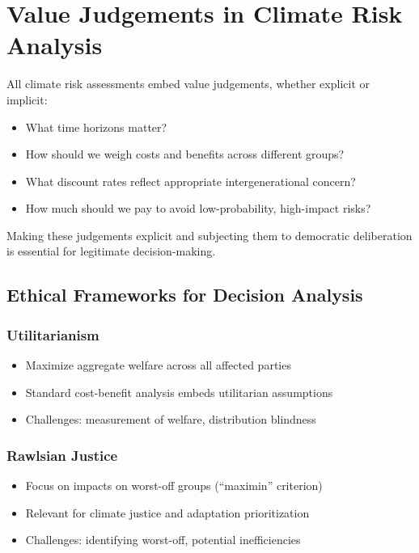 \documentclass[
  letterpaper,
  DIV=11,
  numbers=noendperiod]{scrreprt}
\providecommand{\tightlist}{%
  \setlength{\itemsep}{0pt}\setlength{\parskip}{0pt}}
\begin{document}
\section{Value Judgements in Climate Risk
Analysis}\label{value-judgements-in-climate-risk-analysis}

All climate risk assessments embed value judgements, whether explicit or
implicit:

\begin{itemize}
\tightlist
\item
  What time horizons matter?
\item
  How should we weigh costs and benefits across different groups?
\item
  What discount rates reflect appropriate intergenerational concern?
\item
  How much should we pay to avoid low-probability, high-impact risks?
\end{itemize}

Making these judgements explicit and subjecting them to democratic
deliberation is essential for legitimate decision-making.

\subsection{Ethical Frameworks for Decision
Analysis}\label{ethical-frameworks-for-decision-analysis}

\subsubsection{Utilitarianism}\label{utilitarianism}

\begin{itemize}
\tightlist
\item
  Maximize aggregate welfare across all affected parties
\item
  Standard cost-benefit analysis embeds utilitarian assumptions
\item
  Challenges: measurement of welfare, distribution blindness
\end{itemize}

\subsubsection{Rawlsian Justice}\label{rawlsian-justice}

\begin{itemize}
\tightlist
\item
  Focus on impacts on worst-off groups (``maximin'' criterion)
\item
  Relevant for climate justice and adaptation prioritization
\item
  Challenges: identifying worst-off, potential inefficiencies
\end{itemize}
\end{document}

